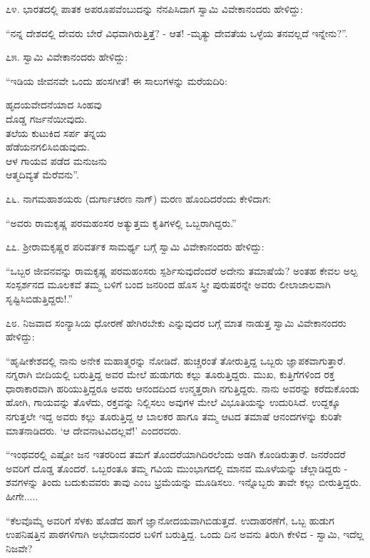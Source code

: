 ೭೪. ಭಾರತದಲ್ಲಿ ಪಾತಕ ಅಪರೂಪವೆಂಬುದನ್ನು ನೆನಪಿಸಿದಾಗ ಸ್ವಾಮಿ ವಿವೇಕಾನಂದರು ಹೇಳಿದ್ದು:

“ನನ್ನ ದೇಶದಲ್ಲಿ ದೇವರು ಬೇರೆ ವಿಧವಾಗಿರುತ್ತಿತ್ತೆ? - ಆತ! -ಮೃತ್ಯು ದೇವತೆಯ ಒಳ್ಳೆಯ ತನವಲ್ಲದೆ ಇನ್ನೇನು?”. 

೭೫. ಸ್ವಾಮಿ ವಿವೇಕಾನಂದರು ಹೇಳಿದ್ದು:

“ಇಡಿಯ ಜೀವನವೇ ಒಂದು ಹಂಸಗೀತೆ! ಈ ಸಾಲುಗಳನ್ನು ಮರೆಯದಿರಿ:

\begin{myquote}
ಹೃದಯವೇದನೆಯಾದ ಸಿಂಹವು\\ದೊಡ್ಡ ಗರ್ಜನೆಯೀವುದು.\\ತಲೆಯ ಕುಟುಕಿದ ಸರ್ಪ ತನ್ನಯ\\ಹೆಡೆಯನಗಲಿಸಿಬಿಡುವುದು.\\ಆಳ ಗಾಯವ ಪಡೆದ ಮನುಜನು\\ಆತ್ಮದಿವ್ಯತೆ ಮೆರೆವನು”. 
\end{myquote}

೭೬. ನಾಗಮಹಾಶಯರು (ದುರ್ಗಾಚರಣ ನಾಗ್) ಮರಣ ಹೊಂದಿದರೆಂದು ಕೇಳಿದಾಗ:

“ಅವರು ರಾಮಕೃಷ್ಣ ಪರಮಹಂಸರ ಅತ್ಯುತ್ತಮ ಕೃತಿಗಳಲ್ಲಿ ಒಬ್ಬರಾಗಿದ್ದರು.” 

೭೭. ಶ‍್ರೀರಾಮಕೃಷ್ಣರ ಪರಿವರ್ತಕ ಸಾಮರ್ಥ್ಯ ಬಗ್ಗೆ ಸ್ವಾಮಿ ವಿವೇಕಾನಂದರು ಹೇಳಿದ್ದು:

“ಒಬ್ಬರ ಜೀವನವನ್ನು ರಾಮಕೃಷ್ಣ ಪರಮಹಂಸರು ಸ್ಪರ್ಶಿಸುವುದೆಂದರೆ ಅದೇನು ತಮಾಷೆಯೆ? ಅಂತಹ ಕೇವಲ ಅಲ್ಪ ಸಂಸ್ಪರ್ಶನದ ಮೂಲಕವೆ ತಮ್ಮ ಬಳಿಗೆ ಬಂದ ಜನರಿಂದ ಹೊಸ ಸ್ತ್ರೀ ಪುರುಷರನ್ನೇ ಅವರು ಲೀಲಾಜಾಲವಾಗಿ ಸೃಷ್ಟಿಸಿಬಿಡುತ್ತಿದ್ದರು!.” 

೭೮. ನಿಜವಾದ ಸಂನ್ಯಾಸಿಯ ಧೋರಣೆ ಹೇಗಿರಬೇಕು ಎನ್ನುವುದರ ಬಗ್ಗೆ ಮಾತ ನಾಡುತ್ತ ಸ್ವಾಮಿ ವಿವೇಕಾನಂದರು ಹೇಳಿದ್ದು:

“ಹೃಷೀಕೇಶದಲ್ಲಿ ನಾನು ಅನೇಕ ಮಹಾತ್ಮರನ್ನು ನೋಡಿದೆ. ಹುಚ್ಚರಂತೆ ತೋರುತ್ತಿದ್ದ ಒಬ್ಬರು ಜ್ಞಾಪಕವಾಗುತ್ತಾರೆ. ನಗ್ನರಾಗಿ ಬೀದಿಯಲ್ಲಿ ಬರುತ್ತಿದ್ದ ಅವರ ಮೇಲೆ ಹುಡುಗರು ಕಲ್ಲು ತೂರುತ್ತಿದ್ದರು. ಮುಖ, ಕುತ್ತಿಗೆಗಳಿಂದ ರಕ್ತ ಧಾರಾಕಾರವಾಗಿ ಹರಿಯುತ್ತಿದ್ದರೂ ಅವರು ಆನಂದದಿಂದ ಉನ್ಮತ್ತರಾಗಿ ನಗುತ್ತಿದ್ದರು. ನಾನು ಅವರನ್ನು ಕರೆದುಕೊಂಡು ಹೋಗಿ, ಗಾಯವನ್ನು ತೊಳೆದು, ರಕ್ತವನ್ನು ನಿಲ್ಲಿಸಲು ಅವುಗಳ ಮೇಲೆ ವಿಭೂತಿಯನ್ನು ಉದುರಿಸಿದೆ. ಉದ್ದಕ್ಕೂ ನಗುತ್ತಲೇ ಇದ್ದ ಅವರು ಕಲ್ಲು ತೂರುತ್ತಿದ್ದ ಆ ಬಾಲಕರ ಹಾಗೂ ತಮ್ಮ ಆಟದ ತಮಾಷೆ ಆನಂದಗಳನ್ನು ಕುರಿತೇ ಮಾತನಾಡಿದರು. ‘ಆ ದೇವನಾಟವಿದಲ್ಲವೆ!’ ಎಂದರವರು.

“ಇಂಥವರಲ್ಲಿ ಎಷ್ಟೋ ಜನ ಇತರರಿಂದ ತಮಗೆ ತೊಂದರೆಯಾಗಿದಿರಲೆಂದು ಅಡಗಿ ಕೊಂಡಿರುತ್ತಾರೆ. ಜನರೆಂದರೆ ಅವರಿಗೆ ದೊಡ್ಡ ತೊಂದರೆ. ಒಬ್ಬರಂತೂ ತಮ್ಮ ಗವಿಯ ಮುಂಭಾಗದಲ್ಲಿ ಮಾನವ ಮೂಳೆಯನ್ನು ಚೆಲ್ಲಾಡಿದ್ದರು - ಶವಗಳನ್ನು ತಿಂದು ಬದುಕುವವರು ತಾವು ಎಂಬ ಭ್ರಮೆಯನ್ನು ಮೂಡಿಸಲು. ಇನ್ನೊಬ್ಬರು ತಾವೇ ಕಲ್ಲು ಬೀರುತ್ತಿದ್ದರು. ಹೀಗೇ.....

“ಕೆಲವೊಮ್ಮೆ ಅವರಿಗೆ ಸೆಳಕು ಹೊಡೆದ ಹಾಗೆ ಜ್ಞಾನೋದಯವಾಗಿಬಿಡುತ್ತದೆ. ಉದಾಹರಣೆಗೆ, ಒಬ್ಬ ಹುಡುಗ ಉಪನಿಷತ್ತಿನ ಪಾಠಗಳಿಗಾಗಿ ಅಭೇದಾನಂದರ ಬಳಿಗೆ ಬರುತ್ತಿದ್ದ. ಒಂದು ದಿನ ಅವನು ತಿರುಗಿ ಕೇಳಿದ - ಸ್ವಾಮಿ, ಇದೆಲ್ಲ ನಿಜವೇ?

